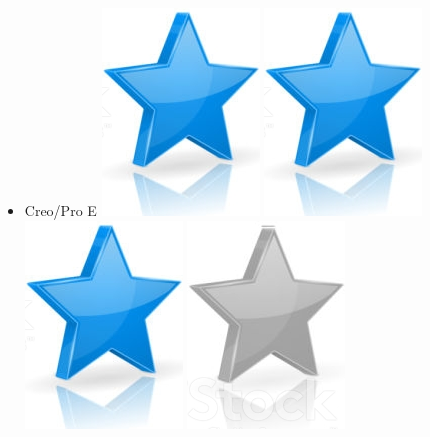 \documentclass[10pt,a4paper,sans]{article}
\begin{document}
\begin{minipage}[t]{0.26\textwidth}
\begin{mdframed}[style=cadreCompetences]
\begin{itemize}
            \item{Creo/Pro E
                    \hfill
                    \includegraphics[scale=0.20]{img/star.png} \hspace{-0.2cm}
                    \includegraphics[scale=0.20]{img/star.png} \hspace{-0.2cm}
                    \includegraphics[scale=0.20]{img/star.png} \hspace{-0.2cm}
                    \includegraphics[scale=0.20]{img/empty_star.png} \hspace{-0.2cm}
}
\end{itemize}
\end{mdframed}
\end{minipage}
\end{document}
